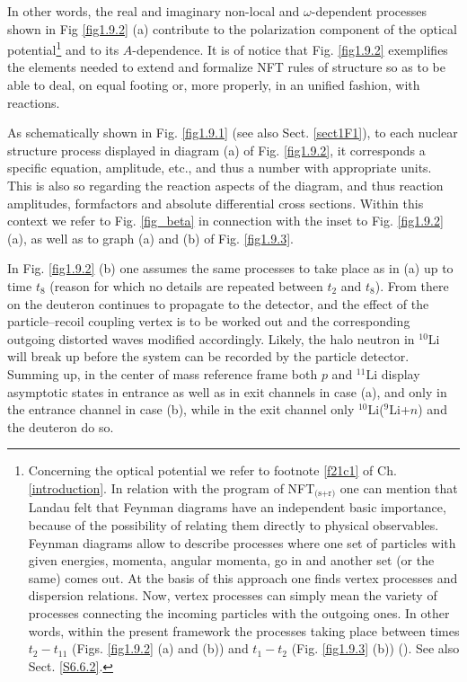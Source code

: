 In other words, the real and imaginary non-local and $\omega$-dependent processes  shown in Fig \ref{fig1.9.2} (a) contribute to the  polarization component of the optical potential\footnote{Concerning the optical potential we refer to footnote \ref{f21c1} of Ch. \ref{introduction}. In relation with the program of NFT$_{\text{(s+r)}}$ one can mention that Landau felt that  Feynman diagrams have an independent basic importance, because of the possibility of relating them directly to physical observables. Feynman diagrams allow to describe processes where one set of particles with given energies, momenta, angular momenta, go in and another set (or the same) comes out. At the basis of this approach one finds vertex processes and dispersion relations. Now, vertex processes can simply mean the variety of processes connecting the incoming particles with the outgoing ones. In other words, within the present framework the processes taking place between times $t_2-t_{11}$ (Figs. \ref{fig1.9.2} (a) and (b)) and $t_1-t_2$ (Fig. \ref{fig1.9.3} (b)) (\cite{Landau:59,terHaar:69}). See also Sect. \ref{S6.6.2}.} and to its $A$-dependence. 
  It is of
notice that Fig. \ref{fig1.9.2} exemplifies  the elements needed to extend and formalize NFT rules of
structure so as to be able to deal, on equal footing or, more properly, in an unified fashion,  with reactions.

As schematically shown in Fig. \ref{fig1.9.1} (see also Sect. \ref{sect1F1}), to each nuclear structure process displayed in diagram (a) of Fig. \ref{fig1.9.2}, it corresponds a specific equation, amplitude, etc., and thus a number with appropriate units. This is also so regarding the reaction aspects of the diagram, and thus reaction amplitudes, formfactors and  absolute differential cross sections.
Within this context we refer to Fig. \ref{fig_beta} in connection with the inset to Fig. \ref{fig1.9.2} (a), as well as to graph (a) and (b) of Fig. \ref{fig1.9.3}.


 In Fig. \ref{fig1.9.2} (b) one assumes the same processes to take place  as in (a) up to time $t_8$ (reason for which no details
are repeated between $t_2$ and $t_8$). From there on the deuteron continues to propagate to
the detector, and the effect of the particle--recoil coupling vertex is to be worked out and the corresponding outgoing distorted waves modified accordingly. Likely, the halo neutron in $^{10}$Li will break up
before the system can be recorded by the particle detector. Summing up, in the center of mass reference frame both $p$ and $^{11}$Li
display asymptotic states in entrance as well as in exit channels in case (a), and only
in the entrance channel in case (b), while in the exit channel only $^{10}$Li($^9$Li+$n$) and the
deuteron do so. 

